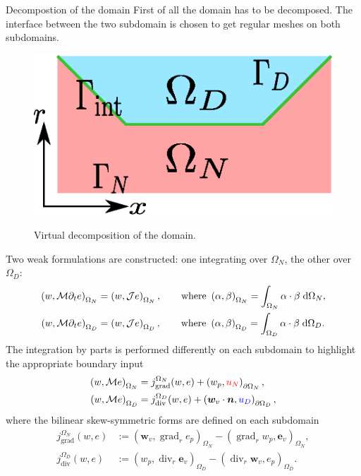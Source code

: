 \documentclass[aspectratio=169]{ISAE-Beamer}
\DeclareMathOperator*{\grad}{grad}
\renewcommand{\div}{\operatorname{div}}
\begin{document}
\begin{frame}{Decompostion of the domain}
First of all the domain has to be decomposed. The interface between the two subdomain is chosen to get regular meshes on both subdomains.
\begin{figure}[t]%
	\centering
	\includegraphics[width=0.5\columnwidth]{domain_split.eps} \\
	\caption{Virtual decomposition of the domain.}
\end{figure}
\end{frame}

\begin{frame}
	Two weak formulations are constructed: one integrating over $\Omega_N$, the other over $\Omega_D$:
	\begin{align*}
	\left(w, \mathcal{M} \partial_t{e} \right)_{\Omega_N} &= \left(w, \mathcal{J} e \right)_{\Omega_{N}}, \qquad \text{where } \left(\alpha, \beta \right)_{\Omega_N} = \int_{\Omega_{N}} \alpha \cdot \beta \d{\Omega_{N}}, \\
	\left(w, \mathcal{M} \partial_t{e} \right)_{\Omega_D} &= \left(w, \mathcal{J} e \right)_{\Omega_{D}}, \qquad \text{where } \left(\alpha, \beta \right)_{\Omega_D} = \int_{\Omega_{D}} \alpha \cdot \beta \d{\Omega_{D}}.
	\end{align*}
	The integration by parts is performed differently on each subdomain to highlight the appropriate boundary input
	\begin{equation*}
	\begin{aligned}
	\left(w, \mathcal{M} e \right)_{\Omega_{N}} &= j_{\text{grad}}^{\Omega_N}(w, e) + \left(w_p, \textcolor{red}{u_N} \right)_{\partial \Omega_N}, \\
	\left(w, \mathcal{M} e \right)_{\Omega_{D}} &= j_{\text{div}}^{\Omega_D}(w, e) + \left(\bm{w}_v \cdot \bm{n}, \textcolor{blue}{u_D} \right)_{\partial \Omega_D},  \\
	\end{aligned} 
	\end{equation*}
where the bilinear skew-symmetric forms are defined on each subdomain
\begin{equation*}
	\begin{aligned}
	j_{\text{grad}}^{\Omega_{N}}(w, e) &:= \left(\bm{w}_v, {\grad}_r e_p \right)_{\Omega_{N}} - \left({\grad}_r w_p, \bm{e}_v \right)_{\Omega_{N}}, \\
	j_{\text{div}}^{\Omega_{D}}(w, e) &:= \left(w_p, \div_r \bm{e}_v \right)_{\Omega_{D}} - \left(\div_r \bm{w}_v, e_p \right)_{\Omega_{D}}.
	\end{aligned}
\end{equation*}
\end{frame}
\end{document}
